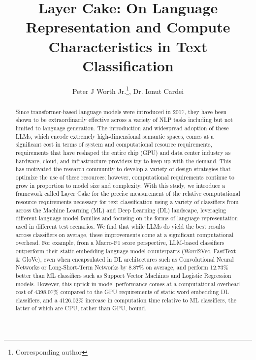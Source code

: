 \documentclass[final]{clv2025-revised}
\begin{document}
\title{Layer Cake: On Language Representation and Compute Characteristics in Text Classification}

\author{Peter J Worth Jr.\thanks{Corresponding author}, Dr. Ionut Cardei}


\maketitle

\begin{abstract}
Since transformer-based language models were introduced in 2017, they have been shown to be extraordinarily effective across a variety of NLP tasks including but not limited to language generation. The introduction and widespread adoption of these LLMs, which encode extremely high-dimensional semantic spaces, comes at a significant cost in terms of system and computational resource requirements, requirements that have reshaped the entire chip (GPU) and data center industry as hardware, cloud, and infrastructure providers try to keep up with the demand. This has motivated the research community to develop a variety of design strategies that optimize the use of these resources; however, computational requirements continue to grow in proportion to model size and complexity. With this study, we introduce a framework called Layer Cake for the precise measurement of the relative computational resource requirements necessary for text classification using a variety of classifiers from across the Machine Learning (ML) and Deep Learning (DL) landscape, leveraging different language model families and focusing on the forms of language representation used in different test scenarios. We find that while LLMs do yield the best results across classifiers on average, these improvements come at a significant computational overhead. For example, from a Macro-F1 score perspective, LLM-based classifiers outperform their static embedding language model counterparts (Word2Vec, FastText \& GloVe), even when encapsulated in DL architectures such as Convolutional Neural Networks or Long-Short-Term Networks by 8.87\% on average, and perform 12.73\% better than ML classifiers such as Support Vector Machines and Logistic Regression models. However, this uptick in model performance comes at a computational overhead cost of 4398.07\% compared to the GPU requirements of static word embedding DL classifiers, and a 4126.02\% increase in computation time relative to ML classifiers, the latter of which are CPU, rather than GPU, bound.
\end{abstract}
\end{document}
